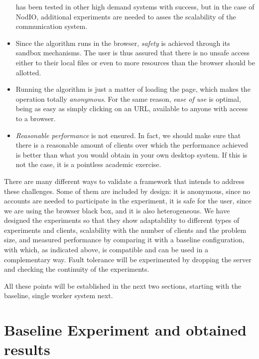 \documentclass[journal,onecolumn]{IEEEtran}
\begin{document}
\begin{itemize}
  has been tested in other high demand systems with success, but 
  in the case of {\sf NodIO}, additional experiments are needed to asses 
  the scalability of the communication system. %
\item Since the algorithm runs in the browser, {\em safety} is
  achieved through its sandbox mechanisms. The user is thus assured
  that there is no unsafe access either to their local files or even
  to more resources than the browser should be allotted.
\item Running the algorithm is just a matter of loading the page,
  which makes the operation totally {\em anonymous}. For the same
  reason, {\em ease of use} is optimal, being as easy as simply
  clicking on an URL, available to anyone with access to a browser.
\item {\em Reasonable performance} is not ensured. In fact, we should
  make sure that there is a reasonable amount of clients over which
  the performance achieved is better than what you would obtain in
  your own desktop system. If this is not the case, it is a pointless
  academic exercise.
\end{itemize}

There are many different ways to validate a framework that intends to
address these challenges. Some of them are included by design: it is
anonymous, since no accounts are needed to participate in the
experiment, it is safe for the user, since we are using the browser
black box, and it is also heterogeneous. We have designed the
experiments so that they show adaptability to different types of
experiments and clients, scalability with the number of clients and
the problem size, and measured performance by comparing it with
a baseline configuration, with which, as indicated above, is
compatible and can be used in a complementary way. Fault tolerance
will be experimented by dropping the server and checking the continuity
of the experiments. 

All these points will be established in the next two sections,
starting with the baseline, single worker system next. 

\section{Baseline Experiment and obtained results} %
\label{sec:experiments}
\end{document}
